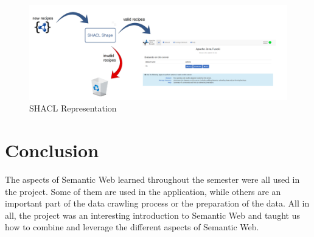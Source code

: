 \documentclass{article}
\begin{document}
\begin{figure}[H]
  \centering
  \includegraphics[width=12cm]{pictures/shacl.png}
  \caption{SHACL Representation}
  \label{fig:shacl}
\end{figure}
\noindent
	
\section{Conclusion}
The aspects of Semantic Web learned throughout the semester were all used in the project. Some of them are used in the application, while others are an important part of the data crawling process or the preparation of the data. All in all, the project was an interesting introduction to Semantic Web and taught us how to combine and leverage the different aspects of Semantic Web.
	
\end{document}

